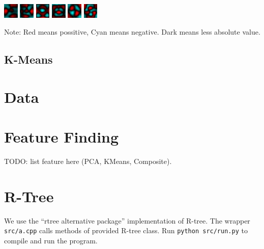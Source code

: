 \documentclass{acm_proc_article-sp}
\begin{document}
        \includegraphics[width=20pt]{../data/PCA_visualize/eigvec11.png}
        \includegraphics[width=20pt]{../data/PCA_visualize/eigvec12.png}
        \includegraphics[width=20pt]{../data/PCA_visualize/eigvec13.png}
        \includegraphics[width=20pt]{../data/PCA_visualize/eigvec14.png}
        \includegraphics[width=20pt]{../data/PCA_visualize/eigvec15.png}
        \includegraphics[width=20pt]{../data/PCA_visualize/eigvec16.png}

Note: Red means possitive, Cyan means negative. Dark means less absolute value.

\subsection{K-Means}

\section{Data}

\section{Feature Finding}

TODO: list feature here (PCA, KMeans, Composite).

\section{R-Tree}
We use the ``rtree alternative package'' implementation of R-tree.
The wrapper \texttt{src/a.cpp} calls methods of provided R-tree class.
Run \texttt{python src/run.py} to compile and run the program.
\end{document}

